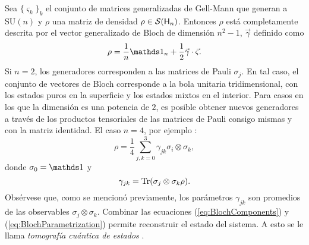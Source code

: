 Sea $\{\varsigma_{k}\}_{k}$ el conjunto de matrices generalizadas de Gell-Mann que generan a $\text{SU}(n)$ y
$\rho$ una matriz de densidad $\rho\in\mathcal{S}({\sf H}_{n})$. Entonces $\rho$ está completamente descrita por el vector generalizado de Bloch de dimensión $n^{2}-1$, $\vec{\gamma}$ definido como
\begin{equation}\label{eq:BlochParametrization}
    \rho=\frac{1}{n}\Id_{n}+\frac{1}{2}\vec{\gamma}\cdot\vec{\varsigma}.
\end{equation}
Si $n=2$, los generadores corresponden a las matrices de Pauli $\sigma_{j}$. En tal caso, el conjunto de vectores de Bloch corresponde a la bola unitaria tridimensional, con los estados puros en la superficie y los estados mixtos en el interior. Para casos en los que la dimensión es una potencia de $2$, es posible obtener nuevos generadores a través de los productos tensoriales de las matrices de Pauli consigo mismas y con la matriz identidad. El caso $n=4$, por ejemplo \cite{Chuang}:
\begin{equation}\label{eq:BlochParametrization4}
    \rho=\frac{1}{4}\sum_{j,k=0}^{3}\gamma_{jk}\sigma_{i}\otimes \sigma_{k},\nonumber
\end{equation}
donde $\sigma_{0}=\Id$ y 
\begin{equation}\label{eq:BlochComponents}
        \gamma_{jk}=\Tr(\sigma_{j}\otimes \sigma_{k}\rho).
\end{equation}
Obsérvese que, como se mencionó previamente, los parámetros $\gamma_{jk}$ son promedios de las observables $\sigma_{j} \otimes \sigma_{k}$. Combinar las ecuaciones (\ref{eq:BlochComponents}) y (\ref{eq:BlochParametrization}) permite reconstruir el estado del sistema. A esto se le llama \textit{tomografía cuántica de estados} \cite{Chuang}.
